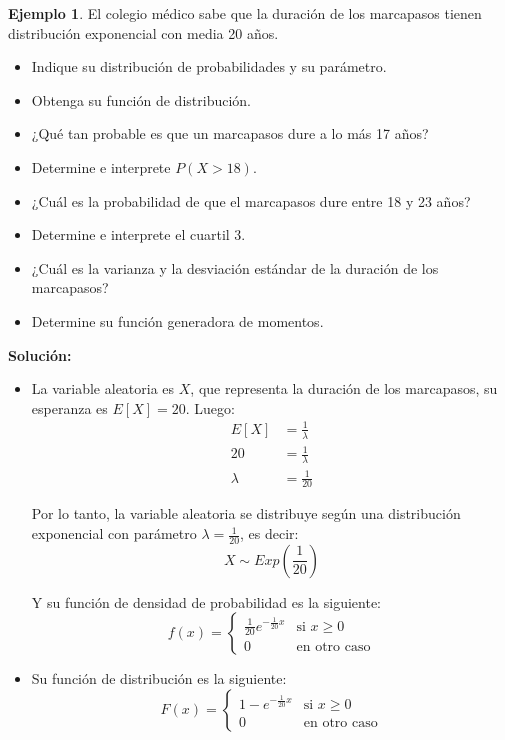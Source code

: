 \documentclass{article}
\theoremstyle{definition}
\newtheorem{example}[definition]{Ejemplo}
\theoremstyle{plain}
\theoremstyle{remark}
\begin{document}
\begin{example}
El colegio médico sabe que la duración de los marcapasos tienen distribución exponencial con media 20 años.

\begin{itemize}
\item Indique su distribución de probabilidades y su parámetro.
\item Obtenga su función de distribución.
\item ¿Qué tan probable es que un marcapasos dure a lo más 17 años?
\item Determine e interprete $P(X > 18)$.
\item ¿Cuál es la probabilidad de que el marcapasos dure entre 18 y 23 años?
\item Determine e interprete el cuartil 3.
\item ¿Cuál es la varianza y la desviación estándar de la duración de los marcapasos?
\item Determine su función generadora de momentos.
\end{itemize}

\textbf{Solución:}

\begin{itemize}

\item La variable aleatoria es $X$, que representa la duración de los marcapasos, su esperanza es $E[X] = 20$. Luego:
\begin{align*}
E[X] &= \frac{1}{\lambda} \\
20 &= \frac{1}{\lambda} \\
\lambda &= \frac{1}{20}
\end{align*}

Por lo tanto, la variable aleatoria se distribuye según una distribución exponencial con parámetro $\lambda = \frac{1}{20}$, es decir:
\[
X \sim Exp\left(\frac{1}{20}\right)
\]

Y su función de densidad de probabilidad es la siguiente:
\[
f(x) = \begin{cases}
\frac{1}{20} e^{-\frac{1}{20} x} & \text{si } x \geq 0 \\
0 & \text{en otro caso}
\end{cases}
\]

\item Su función de distribución es la siguiente:
\[
F(x) = \begin{cases}
1 - e^{-\frac{1}{20} x} & \text{si } x \geq 0 \\
0 & \text{en otro caso}
\end{cases}
\]


\end{itemize}
\end{example}
\end{document}
